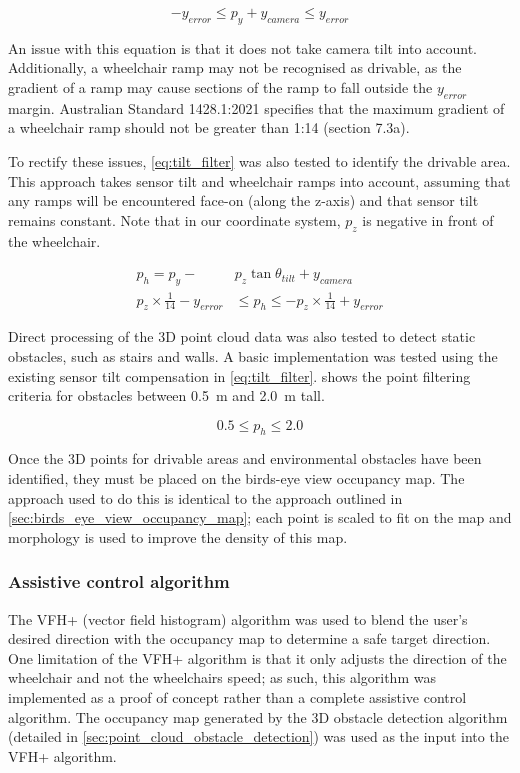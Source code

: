 \begin{equation}
-y_{error} \leq p_y + y_{camera} \leq y_{error}
\label{eq:flat_filter}
\end{equation}

An issue with this equation is that it does not take camera tilt into account.
Additionally, a wheelchair ramp may not be recognised as drivable, as the gradient of a ramp
may cause sections of the ramp to fall outside the $y_{error}$ margin.
Australian Standard 1428.1:2021 \cite{standardsaustralia14282021Design2021} specifies that
the maximum gradient of a wheelchair ramp should not be greater than 1:14 (section 7.3a).

To rectify these issues, \cref{eq:tilt_filter} was also tested to identify the drivable area.
This approach takes sensor tilt and wheelchair ramps into account,
assuming that any ramps will be encountered face-on (along the z-axis) and that
sensor tilt remains constant. Note that in our coordinate system,
$p_z$ is negative in front of the wheelchair.

\begin{equation}
\begin{split}
p_h = p_y - &p_z\tan\theta_{tilt} + y_{camera}\\
p_z\times\frac{1}{14} - y_{error} &\leq p_h \leq -p_z\times\frac{1}{14} + y_{error}
\end{split}
\label{eq:tilt_filter}
\end{equation}

Direct processing of the 3D point cloud data was also tested to detect static obstacles,
such as stairs and walls. A basic implementation was tested using the existing sensor
tilt compensation in \cref{eq:tilt_filter}.  shows the point filtering
criteria for obstacles between \SI{0.5}{\metre} and \SI{2.0}{\metre} tall.

\begin{equation}
0.5 \leq p_h \leq 2.0
\label{eq:obstacle_filter}
\end{equation}

Once the 3D points for drivable areas and environmental obstacles have been identified,
they must be placed on the birds-eye view occupancy map. The approach used to do this
is identical to the approach outlined in \cref{sec:birds_eye_view_occupancy_map};
each point is scaled to fit on the map and morphology is used to improve the density
of this map.

\subsubsection{Assistive control algorithm}
The VFH+ (vector field histogram) algorithm \cite{ulrichVFHReliableObstacle1998} was used to blend
the user's desired direction with the occupancy map to determine a safe target direction.
One limitation of the VFH+ algorithm is that it only adjusts the direction of the wheelchair
and not the wheelchairs speed; as such, this algorithm was implemented as a
proof of concept rather than a complete assistive control algorithm.
The occupancy map generated by the 3D obstacle detection algorithm (detailed in \cref{sec:point_cloud_obstacle_detection})
was used as the input into the VFH+ algorithm.

